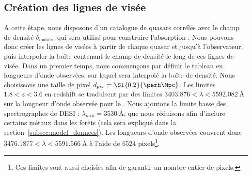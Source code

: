 \subsection{Création des lignes de visée}
\label{subsec:los_interp}
A cette étape, nous disposons d'un catalogue de quasars corrélés avec le champ de densité $\delta_{\mathrm{matière}}$ qui sera utilisé pour construire l'absorption \lya{}. Nous pouvons donc créer les lignes de visées à partir de chaque quasar et jusqu'à l'observateur, puis interpoler la boîte contenant le champ de densité le long de ces lignes de visée.
Dans un premier temps, nous commençons par définir le tableau en longueurs d'onde observées, sur lequel sera interpolé la boîte de densité. Nous choisissons une taille de pixel $d_{pix} = \SI{0.2}{\perh\Mpc}$. Les limites $\num{1.8} < z < \num{3.6}$ en redshift se traduisent par des limites $\num{3403.876} < \lambda < \SI{5592.082}{\angstrom}$ sur la longueur d'onde observée pour le \lya{}. Nous ajoutons la limite basse des spectrographes de DESI : $\lambda_{min} = \SI{3530}{\angstrom}$, que nous réduisons afin d'inclure certains métaux dans les forêts (cela sera expliqué dans la section~\ref{subsec:model_donnees}). Les longueurs d'onde observées couvrent donc $\num{3476.1877} < \lambda < \SI{5591.566}{\angstrom}$ à l'aide de \num{6524} pixels\footnote{Ces limites sont aussi choisies afin de garantir un nombre entier de pixels.}.


